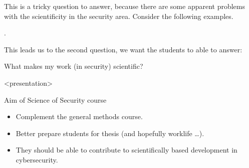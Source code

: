 This is a tricky question to answer, because there are some apparent problems 
with the scientificity in the security area.
Consider the following examples.

\begin{frame}[fragile]
  \begin{example}\label{SoKProblem1}
      .
  \end{example}

  \pause

  \begin{example}\label{SoKProblem2}
  \end{example}
\end{frame}

This leads us to the second question, we want the students to able to answer:

\begin{frame}
  \begin{question}
    What makes my work (in security) scientific?
  \end{question}
\end{frame}

\begin{frame}<presentation>
  \begin{block}{Aim of Science of Security course}
    \begin{itemize}
      \item Complement the general methods course.
      \item Better prepare students for thesis (and hopefully worklife \dots).
      \item They should be able to contribute to scientifically based 
        development in cybersecurity.
    \end{itemize}
  \end{block}
\end{frame}


